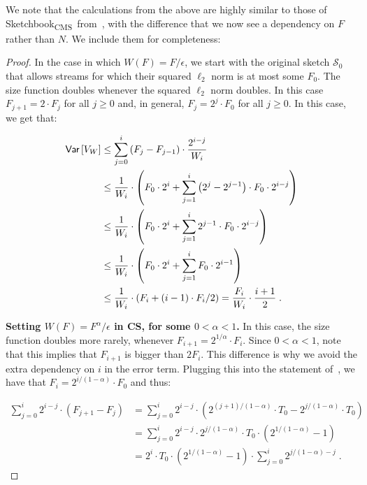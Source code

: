 \documentclass[sigconf]{acmart}
\newcommand{\sketch}{Sketchbook}
\newcommand{\sketchcms}{\sketch\textsubscript{CMS}\xspace}
\begin{document}
We note that the calculations from the above are highly similar to those of \sketchcms\ from~, with the difference that we now see a dependency on $F$ rather than $N$. We include them for completeness:
\begin{proof}
In the case in which $W(F) =  F/\epsilon$, we start with the original sketch $\mathcal{S}_0$ that allows streams for which their squared $\ell_2$ norm is at most some $F_0$. The size function doubles whenever the squared $\ell_2$ norm doubles. In this case $F_{j+1} = 2 \cdot F_j$ for all $j\geq 0$ and, in general, $F_j = 2^j \cdot F_0$ for all $j\geq 0$. In this case, we get that:



\begin{align*}
\textsf{Var}\left[ V_W \right] &\leq  \sum_{j=0}^{i}  \left(F_{j} - F_{j-1}\right) \cdot \frac{2^{i-j}}{W_i} \\
&\leq \frac{1}{W_i} \cdot \left(  F_0\cdot 2^{i}+ \sum_{j=1}^{i}  \left(2^{j} - 2^{j-1}\right) \cdot F_0 \cdot 2^{i-j}\right)\\
&\leq \frac{1}{W_i} \cdot  \left(  F_0\cdot 2^{i}+  \sum_{j=1}^{i}  2^{j-1} \cdot F_0 \cdot 2^{i-j}\right) \\
	&\leq \frac{1}{W_i} \cdot  \left(  F_0\cdot 2^{i}+  \sum_{j=1}^{i}  F_0 \cdot 2^{i-1}\right)\\
	&\leq  \frac{1}{W_i} \cdot  \left(  F_i+  (i-1)\cdot F_i/2\right) =   \frac{F_i}{W_i} \cdot  \frac{i+1}{2} \;.
\end{align*}



\medskip\noindent
\textbf{Setting $W(F) =  F^{\alpha}/\epsilon$ in CS, for some $0<\alpha<1$.} In this case, the size function doubles more rarely, whenever $F_{i+1} = 2^{1/\alpha} \cdot F_i$. Since $0<\alpha<1$, note that this implies that $F_{i+1}$ is bigger than $2F_i$. This difference is why we avoid the extra dependency on $i$ in the error term. Plugging this into the statement of~, we have that $F_i = 2^{i/(1-\alpha)} \cdot F_0$ and thus:

\begin{align*}
\sum_{j=0}^i  2^{i-j} \cdot  (F_{j+1} - F_j) & =	\sum_{j=0}^i  2^{i-j} \cdot  (2^{(j+1)/(1-\alpha)}\cdot T_0 - 2^{j/(1-\alpha)}\cdot T_0)\\
&=  \sum_{j=0}^i  2^{i-j} \cdot  2^{j/(1-\alpha)} \cdot T_0 \cdot (2^{1/(1-\alpha)} -1) \\
&= 2^i \cdot T_0 \cdot (2^{1/(1-\alpha)} -1) \cdot   \sum_{j=0}^i   2^{j/(1-\alpha) - j}   \;.
\end{align*}	



\end{proof}
\end{document}
